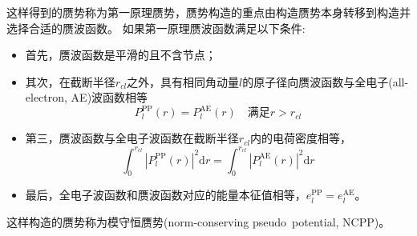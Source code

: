 这样得到的赝势称为第一原理赝势，赝势构造的重点由构造赝势本身转移到构造并选择合适的赝波函数。%
如果第一原理赝波函数满足以下条件\cite{PRB12-4200_1975,PRB18-5449_1978,PRB19-568_1979,PRB20-4082_1979,PRB26-4199_1982,PRL43-1494_1979,JPC13-L189_1980,PRB32-8412_1985,PRB43-1993_1991}:
\begin{itemize}
	\item 首先，赝波函数是平滑的且不含节点；
	\item 其次，在截断半径$r_{cl}$之外\cite{JPC13-L189_1980,PRB43-1993_1991}，具有相同角动量$l$的原子径向赝波函数与全电子(all-electron, AE)波函数相等%
\begin{equation}
	P_l^{\mathrm{PP}}(r)=P_l^{\mathrm{AE}}(r)\quad \mbox{满足}r>r_{cl}
  \label{eq:solid-104}
\end{equation}
	\item 第三，赝波函数与全电子波函数在截断半径$r_{cl}$内的电荷密度相等\cite{PRL43-1494_1979,PRB43-1993_1991}，
\begin{equation} 
	\int_0^{r_{cl}}|P_l^{\mathrm{PP}}(r)|^2\mathrm{d}r=\int_0^{r_{cl}}|P_l^{\mathrm{AE}}(r)|^2\mathrm{d}r
  \label{eq:solid-105}
\end{equation}
	\item 最后，全电子波函数和赝波函数对应的能量本征值相等，$e_l^{\mathrm{PP}}=e_l^{\mathrm{AE}}$。
\end{itemize}
这样构造的赝势称为模守恒赝势(norm-conserving pseudo~potential, NCPP)\cite{PRL43-1494_1979}。

